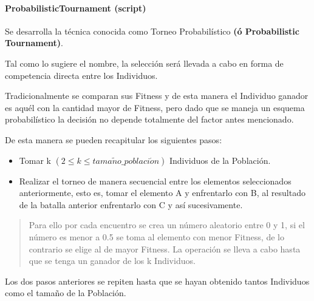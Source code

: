 \documentclass[letterpaper,10pt,english]{sphinxmanual}
\begin{document}
\paragraph{ProbabilisticTournament (script)}
\label{Model/Operator/Selection/ProbabilisticTournament::doc}\label{Model/Operator/Selection/ProbabilisticTournament:probabilistictournament-script}
\begin{DUlineblock}{0em}
\item[] Se desarrolla la técnica conocida como Torneo Probabilístico \textbf{(ó Probabilistic Tournament)}.
\item[] Tal como lo sugiere el nombre, la selección será llevada a cabo en forma de competencia
directa entre los Individuos.
\item[] Tradicionalmente se comparan sus Fitness y de esta manera el Individuo ganador es aquél con
la cantidad mayor de Fitness, pero dado que se maneja un esquema probabilístico la decisión
no depende totalmente del factor antes mencionado.
\item[] 
\item[] De esta manera se pueden recapitular los siguientes pasos:
\end{DUlineblock}
\begin{itemize}
\item {} 
Tomar k \((2 \leqslant k \leqslant tama\tilde{n}o\_poblaci\acute{o}n)\) Individuos de la Población.

\item {} 
Realizar el torneo de manera secuencial entre los elementos seleccionados anteriormente, esto es, tomar el elemento A y enfrentarlo con B, al resultado de la batalla anterior enfrentarlo con C y así sucesivamente.

\end{itemize}
\begin{quote}

Para ello por cada encuentro se crea un número aleatorio entre 0 y 1, si el número es menor a 0.5
se toma al elemento con menor Fitness, de lo contrario se elige al de mayor Fitness.
La operación se lleva a cabo hasta que se tenga un ganador de los k Individuos.
\end{quote}

\begin{DUlineblock}{0em}
\item[] Los dos pasos anteriores se repiten hasta que se hayan obtenido tantos Individuos
como el tamaño de la Población.
\end{DUlineblock}
\label{Model/Operator/Selection/ProbabilisticTournament:module-Model.Operator.Selection.ProbabilisticTournament}
\end{document}
